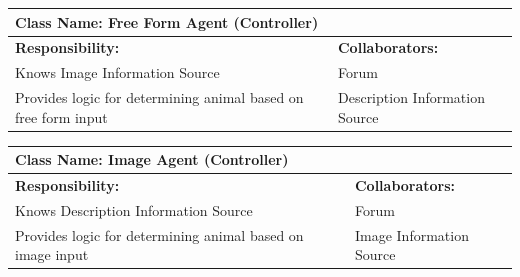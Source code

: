 \documentclass[]{article}
\begin{document}
    	\begin{table}[H]
		\centering
		\begin{tabular}{|p{7cm}|p{7cm}|}
		\hline 
		 \multicolumn{2}{|l|}{\textbf{Class Name: Free Form Agent (Controller)}} \\
		\hline
		\textbf{Responsibility:} & \textbf{Collaborators:} \\
		\hline
		Knows Image Information Source & Forum \\
        Provides logic for determining animal based on free form input & Description Information Source \\

		\hline
		\end{tabular}
	\end{table}


    	\begin{table}[H]
		\centering
		\begin{tabular}{|p{7cm}|p{7cm}|}
		\hline 
		 \multicolumn{2}{|l|}{\textbf{Class Name: Image Agent (Controller)}} \\
		\hline
		\textbf{Responsibility:} & \textbf{Collaborators:} \\
		\hline
		Knows Description Information Source  &  Forum		\\
        Provides logic for determining animal based on image input & Image Information Source \\
		\hline
		\end{tabular}
	\end{table}
	
\FloatBarrier

\appendix
\end{document}
